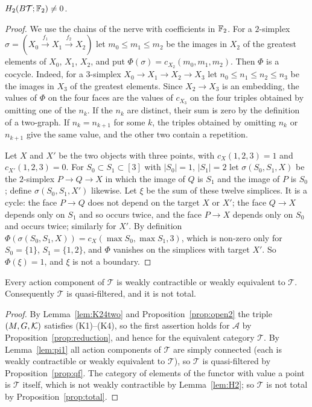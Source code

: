 \begin{lemma}\label{lem:H2}
$H_2(B\mathcal T;\mathbb{F}_2)\ne 0$.
\end{lemma}

\begin{proof}
We use the chains of the nerve with coefficients in $\mathbb{F}_2$. For a
$2$-simplex $\sigma=(X_0\xrightarrow{f_1}X_1\xrightarrow{f_2}X_2)$ let
$m_0\le m_1\le m_2$ be the images in $X_2$ of the greatest elements of $X_0$,
$X_1$, $X_2$, and put $\Phi(\sigma)=c_{X_2}(m_0,m_1,m_2)$. Then $\Phi$ is a
cocycle. Indeed, for a $3$-simplex $X_0\to X_1\to X_2\to X_3$ let
$n_0\le n_1\le n_2\le n_3$ be the images in $X_3$ of the greatest elements.
Since $X_2\to X_3$ is an embedding, the values of $\Phi$ on the four faces are
the values of $c_{X_3}$ on the four triples obtained by omitting one of the
$n_k$. If the $n_k$ are distinct, their sum is zero by the definition of a
two-graph. If $n_k=n_{k+1}$ for some $k$, the triples obtained by omitting
$n_k$ or $n_{k+1}$ give the same value, and the other two contain a
repetition.

Let $X$ and $X'$ be the two objects with three points, with
$c_X(1,2,3)=1$ and $c_{X'}(1,2,3)=0$. For $S_0\subset S_1\subset[3]$ with
$|S_0|=1$, $|S_1|=2$ let $\sigma(S_0,S_1,X)$ be the $2$-simplex
$P\to Q\to X$ in which the image of $Q$ is $S_1$ and the image of $P$ is
$S_0$; define $\sigma(S_0,S_1,X')$ likewise. Let $\xi$ be the sum of these
twelve simplices. It is a cycle: the face $P\to Q$ does not depend on the
target $X$ or $X'$; the face $Q\to X$ depends only on $S_1$ and so occurs
twice, and the face $P\to X$ depends only on $S_0$ and occurs twice; similarly
for $X'$. By definition $\Phi(\sigma(S_0,S_1,X))=c_X(\max S_0,\max S_1,3)$,
which is non-zero only for $S_0=\{1\}$, $S_1=\{1,2\}$, and $\Phi$ vanishes on
the simplices with target $X'$. So $\Phi(\xi)=1$, and $\xi$ is not a boundary.
\end{proof}

\begin{theorem}\label{thm:twographs}
Every action component of $\mathcal T$ is weakly contractible or weakly
equivalent to $\mathcal T$. Consequently $\mathcal T$ is quasi-filtered, and
it is not total.
\end{theorem}

\begin{proof}
By Lemma~\ref{lem:K24two} and Proposition~\ref{prop:open2} the triple
$(M,G,\mathcal{K})$ satisfies (K1)--(K4), so the first assertion holds for $\mathcal A$
by Proposition~\ref{prop:reduction}, and hence for the equivalent category
$\mathcal T$. By Lemma~\ref{lem:pi1} all action components of $\mathcal T$ are
simply connected (each is weakly contractible or weakly equivalent to
$\mathcal T$), so $\mathcal T$ is quasi-filtered by
Proposition~\ref{prop:qf}. The category of elements of the functor with value
a point is $\mathcal T$ itself, which is not weakly contractible by
Lemma~\ref{lem:H2}; so $\mathcal T$ is not total by
Proposition~\ref{prop:total}.
\end{proof}

